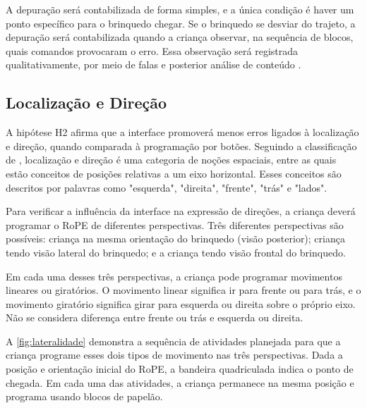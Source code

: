 A depuração será contabilizada de forma simples, e a única condição é haver um ponto específico para o brinquedo chegar. Se o brinquedo se desviar do trajeto, a depuração será contabilizada quando a criança observar, na sequência de blocos, quais comandos provocaram o erro. Essa observação será registrada qualitativamente, por meio de falas e posterior análise de conteúdo \cite{bardin_alise_1979}.

\subsection{Localização e Direção}
A hipótese H2 afirma que a interface promoverá menos erros ligados à localização e direção, quando comparada à programação por botões. Seguindo a classificação de , localização e direção é uma categoria de noções espaciais, entre as quais estão conceitos de posições relativas a um eixo horizontal. Esses conceitos são descritos por palavras como "esquerda", "direita", "frente", "trás" e "lados". 

Para verificar a influência da interface na expressão de direções, a criança deverá programar o RoPE de diferentes perspectivas. Três diferentes perspectivas são possíveis: criança na mesma orientação do brinquedo (visão posterior); criança tendo visão lateral do brinquedo; e a criança tendo visão frontal do brinquedo.

Em cada uma desses três perspectivas, a criança pode programar movimentos lineares ou giratórios. O movimento linear significa ir para frente ou para trás, e o movimento giratório significa girar para esquerda ou direita sobre o próprio eixo. Não se considera diferença entre frente ou trás e esquerda ou direita.

A \autoref{fig:lateralidade} demonstra a sequência de atividades planejada para que a criança programe esses dois tipos de movimento nas três perspectivas. Dada a posição e orientação inicial do RoPE, a bandeira quadriculada indica o ponto de chegada. Em cada uma das atividades, a criança permanece na mesma posição e programa usando blocos de papelão.

